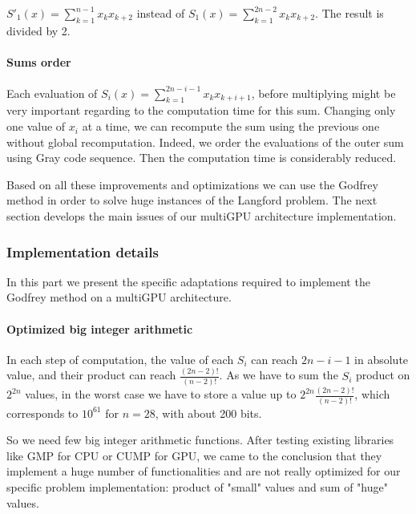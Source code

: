 \noindent $S'_1(x) = \sum_{k=1}^{n-1}x_kx_{k+2}$ instead of $S_1(x) = \sum_{k=1}^{2n-2} x_kx_{k+2}$.
The result is divided by 2. 

\paragraph{Sums order}

Each evaluation of $ S_i(x) = \sum_{k=1}^{2n-i-1} x_kx_{k+i+1} $, before multiplying might be very important regarding to the computation time for this sum. 
Changing only one value of $ x_i $ at a time, we can recompute the sum using the previous one without global recomputation. 
Indeed, we order the evaluations of the outer sum using Gray code sequence. 
Then the computation time is considerably reduced.  

Based on all these improvements and optimizations we can use the Godfrey method in order to solve huge instances of the Langford problem. 
The next section develops the main issues of our multiGPU architecture implementation. 

\subsubsection{Implementation details}
In this part we present the specific adaptations required to implement the Godfrey method on a multiGPU architecture.

\paragraph{Optimized big integer arithmetic}

In each step of computation, the value of each $S_i$ can reach $2n-i-1$ in absolute value, and their product can reach $\frac{(2n-2)!}{(n-2)!}$. 
As we have to sum the $S_i$ product on $2^{2n}$ values, in the worst case we have to store a value up to $2^{2n}\frac{(2n-2)!}{(n-2)!}$, which corresponds to $10^{61}$ for $n=28$, with about 200 bits.

So we need few big integer arithmetic functions. After testing existing libraries like GMP for CPU or CUMP for GPU, we came to the conclusion that they implement a huge number of functionalities and are not really optimized for our specific problem implementation: product of "small" values and sum of "huge" values. 

